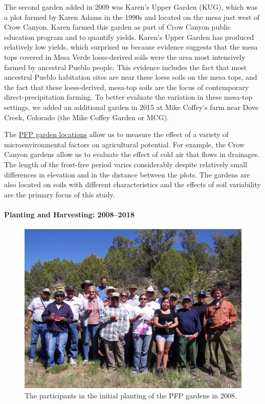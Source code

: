 \documentclass[12pt,]{article}
\let\oldparagraph\paragraph
\renewcommand{\paragraph}[1]{\oldparagraph{#1}\mbox{}}
\begin{document}
The second garden added in 2009 was Karen's Upper Garden (KUG), which was a plot farmed by Karen Adams in the 1990s and located on the mesa just west of Crow Canyon. Karen farmed this garden as part of Crow Canyon public education program and to quantify yields. Karen's Upper Garden has produced relatively low yields, which surprised us because evidence suggests that the mesa tops covered in Mesa Verde loess-derived soils were the area most intensively farmed by ancestral Pueblo people. This evidence includes the fact that most ancestral Pueblo habitation sites are near these loess soils on the mesa tops, and the fact that these loess-derived, mesa-top soils are the focus of contemporary direct-precipitation farming. To better evaluate the variation in these mesa-top settings, we added an additional garden in 2015 at Mike Coffey's farm near Dove Creek, Colorado (the Mike Coffey Garden or MCG).

The \protect\hyperlink{where-did-the-pfp-take-place}{PFP garden locations} allow us to measure the effect of a variety of microenvironmental factors on agricultural potential. For example, the Crow Canyon gardens allow us to evaluate the effect of cold air that flows in drainages. The length of the frost-free period varies considerably despite relatively small differences in elevation and in the distance between the plots. The gardens are also located on soils with different characteristics and the effects of soil variability are the primary focus of this study.

\hypertarget{planting-and-harvesting-20082018}{%
\paragraph{Planting and Harvesting: 2008--2018}\label{planting-and-harvesting-20082018}}

\begin{figure}
\centering
\includegraphics{./images/2008_planting_fields.jpg}
\caption{The participants in the initial planting of the PFP gardens in 2008.}
\end{figure}
\end{document}
